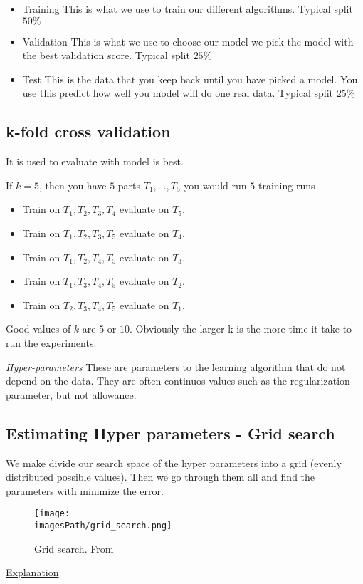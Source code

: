 \begin{multicols}{2}
\begin{itemize}
    \item Training \newline
    This is what we use to train our different algorithms. Typical split $50\%$
    \item Validation \newline 
    This is what we use to choose our model we pick the model with the best validation score. Typical split $25\%$
    \item Test \newline 
    This is the data that you keep back until you have picked a model. You use this predict how well you model will do one real data. Typical split $25\%$
\end{itemize}

\subsection{k-fold cross validation}
It is used to evaluate with model is best.

If $k = 5$, then you have $5$ parts $T_1,\ldots,T_5$ you would run $5$ training runs
\begin{itemize}
    \item Train on $T_1, T_2, T_3, T_4$ evaluate on $T_5$.
    \item Train on $T_1, T_2, T_3, T_5$ evaluate on $T_4$.
    \item Train on $T_1, T_2, T_4, T_5$ evaluate on $T_3$.
    \item Train on $T_1, T_3, T_4, T_5$ evaluate on $T_2$.
    \item Train on $T_2, T_3, T_4, T_5$ evaluate on $T_1$.
\end{itemize}
Good values of $k$ are $5$ or $10$. Obviously the larger k is the more time it take to run the experiments.

\textit{Hyper-parameters} \newline
These are parameters to the learning algorithm that do not depend on the data.
They are often continuos values such as the regularization parameter, but not allowance.

\subsection{Estimating Hyper parameters - Grid search}
We make divide our search space of the hyper parameters into a grid (evenly distributed possible values).
Then we go through them all and find the parameters with minimize the error.
\begin{figure}[H]
    \centering
    \texttt{[image: \\imagesPath/grid\_search.png]}
    \caption{Grid search. From \cite{iml}}
\end{figure}
\href{https://www.youtube.com/watch?v=ttE0F7fghfk}{Explanation}



\end{multicols}
